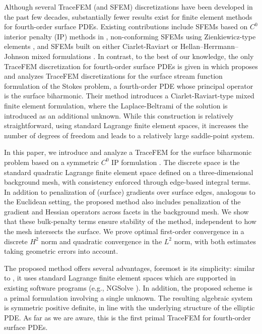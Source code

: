 \documentclass[10pt, a4paper]{amsart}
\theoremstyle{definition}
\theoremstyle{remark}
\theoremstyle{example}
\numberwithin{equation}{section}
\begin{document}
Although several TraceFEM (and SFEM) discretizations have been
developed in the past few decades, substantially fewer
results exist for finite element methods for fourth-order surface PDEs.
Existing contributions include 
 SFEMs based on $C^0$ interior penalty (IP) methods
in \cite{LarssonLarson17,neilan2025c0}, non-conforming SFEMs using
Zienkiewicz-type  elements \cite{WuZhou25}, and SFEMs built
on either Ciarlet-Raviart or Hellan–Herrmann–Johnson mixed formulations
\cite{NitschkeEtal12,BranderEtAl22,Walker22,SunEtal20}.
In contrast, to the best of our knowledge, the only TraceFEM discretization for fourth-order
surface PDEs is given in 
 \cite{reusken2020stream,BranderReusken20} which proposes and 
 analyzes TraceFEM discretizations for the surface stream function
 formulation of the Stokes problem, a fourth-order PDE whose
 principal operator is the surface biharmonic. 
Their method introduces a Ciarlet-Raviart-type mixed finite
element formulation, where the Laplace-Beltrami of the solution is introduced
as an additional unknown. While this construction is relatively straightforward,
using standard Lagrange finite element spaces, it increases
the number of degrees of freedom and leads to a relatively
large saddle-point system.

In this paper, we introduce and analyze a TraceFEM for the surface biharmonic
problem based on a symmetric $C^0$ IP formulation \cite{BrennerSung05,EngelEtal02}.
The discrete space is the standard 
 quadratic Lagrange finite element space defined on a three-dimensional
 background mesh, with consistency enforced through edge-based integral terms.
 In addition to penalization of (surface) gradients over surface edges, analogous to the Euclidean setting, the proposed method also includes penalization 
    of the gradient and Hessian operators across facets in the background mesh. We show
    that these bulk-penalty terms ensure stability of the method, independent
    to how the mesh intersects the  surface.
We prove optimal first-order convergence in a discrete 
$H^2$ norm and quadratic convergence in the $L^2$ norm, with both
estimates taking geometric errors into account.


The proposed method offers several advantages, foremost is
its simplicity:  similar to  \cite{reusken2020stream,BranderReusken20},
it uses standard Lagrange finite element spaces which 
are supported in existing software programs (e.g., NGSolve \cite{ngsolve}).
In addition, the proposed scheme is a primal formulation involving a single unknown.
The resulting algebraic system is symmetric positive definite, in line
with the underlying structure of the elliptic PDE. 
As far as we are 
aware, this is the first primal TraceFEM for fourth-order surface PDEs.
\end{document}
